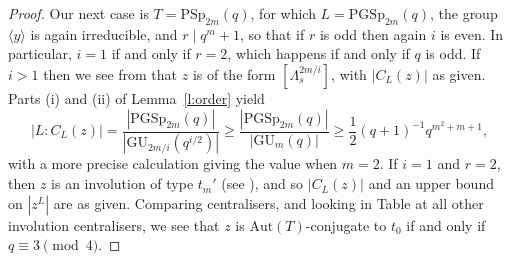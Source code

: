\documentclass[twoside,a4paper,reqno,11pt]{amsart}
\newcommand{\<}{\langle}
\renewcommand{\>}{\rangle}
\newcommand{\la}{\langle}
\newcommand{\ra}{\rangle}
\newcommand{\geqs}{\geqslant}
\newcommand{\Aut}{\mathrm{Aut}}
\newcommand{\PSp}{\mathrm{PSp}}
\newcommand{\GU}{\mathrm{GU}}
\theoremstyle{definition}
\begin{document}
\begin{proof}
Our next case is $T = \PSp_{2m}(q)$, for which $L = \mathrm{PGSp}_{2m}(q)$, the group $\la y \ra$ is again irreducible, and $r \mid q^{m}+1$, so that if $r$ is odd then again $i$ is even. In particular,  $i = 1$ if and only if $r = 2$, which happens if and only if $q$ is odd. If $i > 1$ then we see from \cite[Table B.7]{BG_classical} that $z$ is of the form $[\Lambda_s^{2m/i}]$, with $|C_L(z)|$ as given. Parts (i) and (ii) of Lemma~\ref{l:order} yield
	\begin{equation*}
	|L:C_L(z)| = \frac{|\mathrm{PGSp}_{2m}(q)|}{|\GU_{2m/i}(q^{i/2})|} \geqs \frac{|\mathrm{PGSp}_{2m}(q)|}{|\GU_{m}(q)|} \geqs \frac{1}{2}(q+1)^{-1}q^{m^2+m+1},
	\end{equation*}
    with a more precise calculation giving the value when $m = 2$.
If $i = 1$  and $r = 2$, then $z$ is an involution of type $t_{m}'$ (see \cite[Section 3.4.2.5]{BG_classical}), and so $|C_L(z)|$ and an upper bound on $|z^{L}|$ are as given.  Comparing centralisers, and looking in Table \cite[Table B.7]{BG_classical} at all other involution centralisers, we see that $z$ is $\Aut(T)$-conjugate to $t_0$ if and only if $q \equiv 3 \pmod 4$. %



\end{proof}
\end{document}
